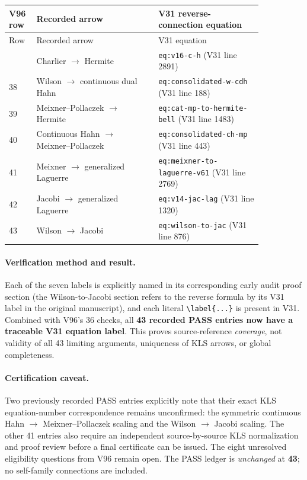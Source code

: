 \documentclass[11pt]{article}
\begin{document}
\begin{center}\small
\begin{longtable}{@{}p{0.07\linewidth}p{0.42\linewidth}p{0.36\linewidth}@{}}
\toprule V96 row & Recorded arrow & V31 reverse-connection equation \\
\midrule\endfirsthead
\toprule Row & Recorded arrow & V31 equation \\
\midrule\endhead
\bottomrule\endfoot
37 & Charlier $\to$ Hermite & \texttt{eq:v16-c-h} (V31 line 2891) \\
38 & Wilson $\to$ continuous dual Hahn & \texttt{eq:consolidated-w-cdh} (V31 line 188) \\
39 & Meixner--Pollaczek $\to$ Hermite & \texttt{eq:cat-mp-to-hermite-bell} (V31 line 1483) \\
40 & Continuous Hahn $\to$ Meixner--Pollaczek & \texttt{eq:consolidated-ch-mp} (V31 line 443) \\
41 & Meixner $\to$ generalized Laguerre & \texttt{eq:meixner-to-laguerre-v61} (V31 line 2769) \\
42 & Jacobi $\to$ generalized Laguerre & \texttt{eq:v14-jac-lag} (V31 line 1320) \\
43 & Wilson $\to$ Jacobi & \texttt{eq:wilson-to-jac} (V31 line 876) \\
\end{longtable}
\end{center}
\paragraph{Verification method and result.} Each of the seven labels is explicitly named in its corresponding early audit proof section (the Wilson-to-Jacobi section refers to the reverse formula by its V31 label in the original manuscript), and each literal \texttt{\textbackslash label\{...\}} is present in V31. Combined with V96's 36 checks, all \textbf{43 recorded PASS entries now have a traceable V31 equation label}. This proves source-reference \emph{coverage}, not validity of all 43 limiting arguments, uniqueness of KLS arrows, or global completeness.

\paragraph{Certification caveat.} Two previously recorded PASS entries explicitly note that their exact KLS equation-number correspondence remains unconfirmed: the symmetric continuous Hahn $\to$ Meixner--Pollaczek scaling and the Wilson $\to$ Jacobi scaling. The other 41 entries also require an independent source-by-source KLS normalization and proof review before a final certificate can be issued. The eight unresolved eligibility questions from V96 remain open. The PASS ledger is \emph{unchanged} at \textbf{43}; no self-family connections are included.
\end{document}
